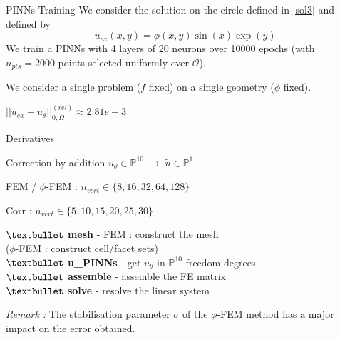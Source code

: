 \begin{frame}{PINNs Training}
    We consider the solution on the circle defined in \eqref{sol3} and defined by
    \begin{equation*}
        u_{ex}(x,y)=\phi(x,y)\sin(x)\exp(y)
    \end{equation*}
    We train a PINNs with 4 layers of 20 neurons over 10000 epochs (with $n_{pts}=2000$ points selected uniformly over $\mathcal{O}$).

    \centering

    {\selectfont{}\relax} We consider a single problem ($f$ fixed) on a single geometry ($\phi$ fixed).

    \raggedright    
    $||u_{ex}-u_\theta||_{0,\Omega}^{(rel)}\approx 2.81e-3$
\end{frame}

\begin{frame}{Derivatives}
    \; \\
    
    \centering
\end{frame}

\begin{frame}{Correction by addition}
    $u_\theta\in\mathbb{P}^{10} \; \rightarrow \; \tilde{u}\in\mathbb{P}^1$

    \begin{minipage}{0.5\linewidth}
        \centering
    
        \raggedright
        FEM / $\phi$-FEM : $n_{vert}\in\{8,16,32,64,128\}$
        
        Corr : $n_{vert}\in\{5,10,15,20,25,30\}$
    \end{minipage} \quad
    \begin{minipage}{0.46\linewidth}
        \centering

        \small\raggedright
        $\textbullet$ \textbf{mesh} - FEM : construct the mesh \\
        ($\phi$-FEM : construct cell/facet sets) \\
        $\textbullet$ \textbf{u\_PINNs} - get $u_\theta$ in $\mathbb{P}^{10}$ freedom degrees \\
        $\textbullet$ \textbf{assemble} - assemble the FE matrix \\
        $\textbullet$ \textbf{solve} - resolve the linear system
    \end{minipage}

    \small
    \textit{Remark :} The stabilisation parameter $\sigma$ of the $\phi$-FEM method has a major impact on the error obtained.
\end{frame}